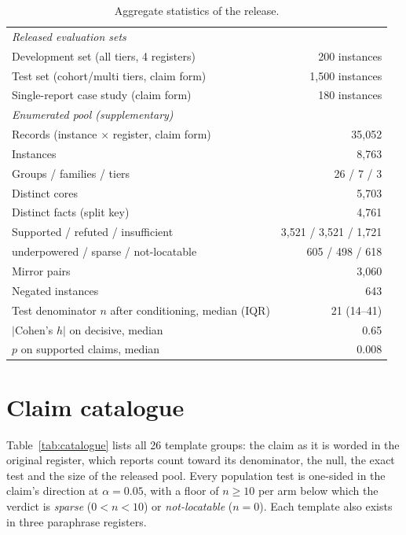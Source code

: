 \begin{table}[htbp]
\centering
\small
\begin{tabular}{lr}
\toprule
\multicolumn{2}{l}{\textit{Released evaluation sets}} \\
Development set (all tiers, 4 registers) & 200 instances \\
Test set (cohort/multi tiers, claim form) & 1{,}500 instances \\
Single-report case study (claim form) & 180 instances \\
\midrule
\multicolumn{2}{l}{\textit{Enumerated pool (supplementary)}} \\
Records (instance $\times$ register, claim form) & 35{,}052 \\
Instances & 8{,}763 \\
Groups / families / tiers & 26 / 7 / 3 \\
Distinct cores & 5{,}703 \\
Distinct facts (split key) & 4{,}761 \\
\midrule
Supported / refuted / insufficient & 3{,}521 / 3{,}521 / 1{,}721 \\
\quad underpowered / sparse / not-locatable & 605 / 498 / 618 \\
Mirror pairs & 3{,}060 \\
Negated instances & 643 \\
\midrule
Test denominator $n$ after conditioning, median (IQR) & 21 (14--41) \\
$|$Cohen's $h|$ on decisive, median & 0.65 \\
$p$ on supported claims, median & 0.008 \\
\bottomrule
\end{tabular}
\caption{Aggregate statistics of the release.}
\label{tab:totals}
\end{table}
\fi

\section{Claim catalogue}
\label{app:stats}
\label{app:catalogue}

Table~\ref{tab:catalogue} lists all 26 template groups: the claim as it is
worded in the original register, which reports count toward its
denominator, the null, the exact test and the size of the released pool.
Every population test is one-sided in the claim's direction at
$\alpha = 0.05$, with a floor of $n \geq 10$ per arm below which the verdict
is \emph{sparse} ($0 < n < 10$) or \emph{not-locatable} ($n = 0$). Each
template also exists in three paraphrase registers.

